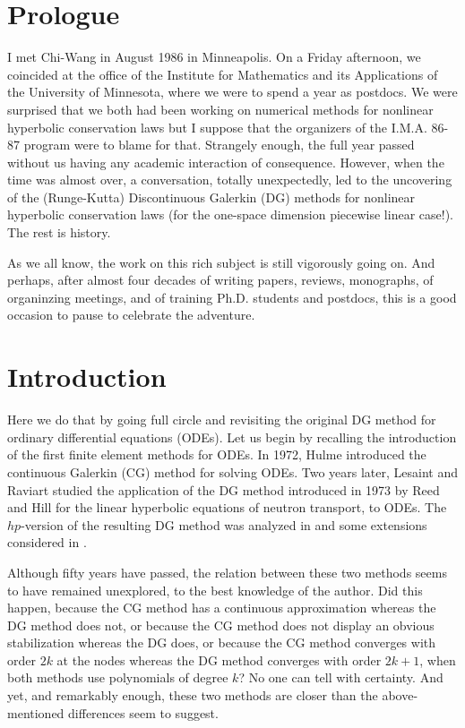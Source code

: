 \documentclass[bpam,reqno]{ipart}
\begin{document}

\section{Prologue}
I met Chi-Wang in August 1986 in Minneapolis.
On a Friday afternoon, we coincided at the 
office of the Institute for Mathematics and 
its Applications of the University of 
Minnesota, where we were to spend a year as 
postdocs. We were surprised that we both had 
been working on numerical methods for 
nonlinear hyperbolic conservation laws but I 
suppose that the organizers of the I.M.A. 
86-87 program were to blame for that. Strangely enough, the 
full year 
passed without us having any academic 
interaction of consequence. However, when the time was almost over, a conversation, totally unexpectedly, led to the uncovering of the (Runge-Kutta)
Discontinuous Galerkin (DG) methods for 
nonlinear hyperbolic conservation laws (for 
the one-space dimension piecewise linear case!). The rest is 
history.

As we all know, the work on this rich  subject is still vigorously going on. And perhaps,
after almost four decades of writing papers, 
reviews, monographs, of organinzing meetings, 
and of training Ph.D. students and postdocs, this is a good 
occasion to pause to celebrate the adventure. 

\section{Introduction}
\label{sec:introduction}
Here we do that by going full circle and revisiting the original DG method for ordinary differential equations (ODEs). Let us begin by recalling the introduction of the first finite element methods for ODEs.
In 1972, Hulme \cite{HulmeI72,HulmeII72} introduced the continuous Galerkin (CG) method for solving ODEs. Two  years later, Lesaint and Raviart \cite{LesaintRaviart74} studied the application of the DG method introduced in 1973 by Reed and Hill \cite{ReedHill73} for the linear hyperbolic equations of neutron transport, to ODEs. The $hp$-version of the resulting DG method was analyzed in \cite{SchoetzauSchwabCALCOLO} and some extensions considered in \cite{DelfourHagerTrochu81}.

Although fifty years have passed, the relation between these two methods seems to have remained unexplored, to the best knowledge of the author. Did this happen, because the CG method has a continuous approximation whereas the DG method does not, or because the CG method does not display an obvious stabilization whereas the DG does, or because the CG method converges with order $2k$ at the nodes whereas the DG method converges with order $2k+1$, when both methods use polynomials of degree $k$? No one can tell with certainty. { And yet,} and remarkably enough, these two methods are closer than the above-mentioned differences seem to suggest. 
\end{document}
